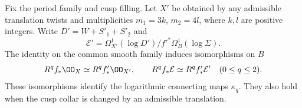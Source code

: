 \begin{proposition}\hypertarget{tag-01S3}{}\label{inv:B1.1}

Fix the period family and cusp filling. Let $X'$ be obtained by any
admissible translation twists and multiplicities $m_1=3k$, $m_2=4l$,
where $k,l$ are positive integers. Write $D'=W+S'_1+S'_2$ and
\[
\mathcal E'=\Omega^1_{X'}(\log D')/f'^*\Omega^1_B(\log\Sigma).
\]
The identity on the common smooth family induces isomorphisms on $B$
\[
R^qf_*\OO_X\simeq R^qf'_*\OO_{X'},\qquad
R^qf_*\mathcal E\simeq R^qf'_*\mathcal E'\quad(0\le q\le2).
\]
These isomorphisms identify the logarithmic connecting maps $\kappa_q$.
They also hold when the cusp collar is changed by an admissible translation.
\end{proposition}


